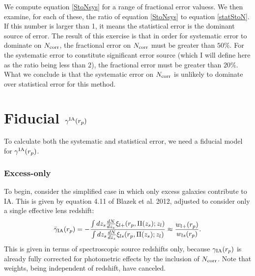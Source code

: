 \documentclass[onecolumn,amsmath,aps,fleqn, superscriptaddress]{revtex4}
\begin{document}
We compute equation \ref{StoNsys} for a range of fractional error valuess. We then examine, for each of these, the ratio of equation \ref{StoNsys} to equation \ref{statStoN}. If this number is larger than 1, it means the statistical error is the dominant source of error. The result of this exercise is that in order for systematic error to dominate on $N_{\rm corr}$, the fractional error on $N_{\rm corr}$ must be greater than $50\%$. For the systematic error to constitute significant error source (which I will define here as the ratio being less than 2), the fractional error must be greater than $20\%$. What we conclude is that the systematic error on $N_{\rm corr}$ is unlikely to dominate over statistical error for this method.

\section*{Fiducial $\gamma^{\rm IA}(r_p)$}
To calculate both the systematic and statistical error, we need a fiducial model for $\gamma^{\rm IA}(r_p)$.

\subsubsection*{Excess-only}
To begin, consider the simplified case in which only excess galaxies contribute to IA. This is given by equation 4.11 of Blazek et al. 2012, adjusted to consider only a single effective lens redshift:
\begin{equation}
\bar{\gamma}_{\rm IA}(r_p) = -\frac{\int dz_s \frac{dN}{dz_s} \xi_{l+}(r_p, \Pi(z_s); z_l)}{\int dz_s \frac{dN}{dz_s} \xi_{ls}(r_p, \Pi(z_s); z_l)} \approx \frac{w_{l+}(r_p)}{w_{ls}(r_p)}.
\label{gamma_blazek}
\end{equation}
This is given in terms of spectroscopic source redshifts only, because $\gamma_{\rm IA}(r_p)$ is already fully corrected for photometric effects by the inclusion of $N_{\rm corr}$. Note that weights, being independent of redshift, have canceled. 
\end{document}
